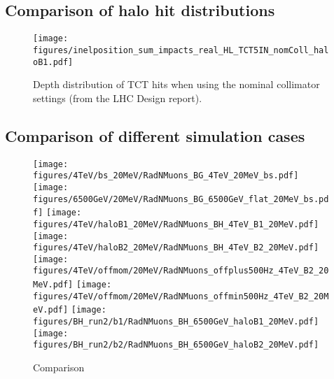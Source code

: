 \subsection{Comparison of halo hit distributions}


\begin{figure}
\begin{center}
\texttt{[image: figures/inelposition\_sum\_impacts\_real\_HL\_TCT5IN\_nomColl\_haloB1.pdf]}
\end{center}
 \caption{Depth distribution of TCT hits when using the nominal collimator settings (from the LHC Design report).
  \label{inelHLtct5inNomCrab}}
\end{figure}



\subsection{Comparison of different simulation cases \label{compRun1Run2}}


\begin{figure}
\begin{center}
  \texttt{[image: figures/4TeV/bs\_20MeV/RadNMuons\_BG\_4TeV\_20MeV\_bs.pdf]}
  \texttt{[image: figures/6500GeV/20MeV/RadNMuons\_BG\_6500GeV\_flat\_20MeV\_bs.pdf]}
  \texttt{[image: figures/4TeV/haloB1\_20MeV/RadNMuons\_BH\_4TeV\_B1\_20MeV.pdf]}
  \texttt{[image: figures/4TeV/haloB2\_20MeV/RadNMuons\_BH\_4TeV\_B2\_20MeV.pdf]}
  \texttt{[image: figures/4TeV/offmom/20MeV/RadNMuons\_offplus500Hz\_4TeV\_B2\_20MeV.pdf]}
  \texttt{[image: figures/4TeV/offmom/20MeV/RadNMuons\_offmin500Hz\_4TeV\_B2\_20MeV.pdf]}
  \texttt{[image: figures/BH\_run2/b1/RadNMuons\_BH\_6500GeV\_haloB1\_20MeV.pdf]}
  \texttt{[image: figures/BH\_run2/b2/RadNMuons\_BH\_6500GeV\_haloB2\_20MeV.pdf]}
\end{center}
\vspace{-0.6cm}
 \caption{Comparison 
  \label{compRadNMuonsRun1}}
\end{figure}



